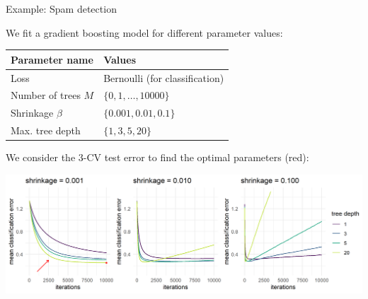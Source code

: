 \begin{vbframe}{Example: Spam detection}







%

We fit a gradient boosting model for different parameter values:

\begin{table}[]
\footnotesize
\centering
\begin{tabular}{l|l}
Parameter name      & Values                         \\
\hline
Loss        & Bernoulli (for classification) \\
Number of trees $M$ & $\{0, 1,\dots,10000\}$              \\
Shrinkage $\beta$     & $\{0.001, 0.01, 0.1\}$           \\
Max. tree depth     & $\{1, 3, 5, 20\}$
\end{tabular}
\end{table}

\vfill
We consider the 3-CV test error to find the optimal parameters (red):




\begin{center}
\includegraphics[width=\textwidth]{figure/gbm_spam.png}
\end{center}


\end{vbframe}

